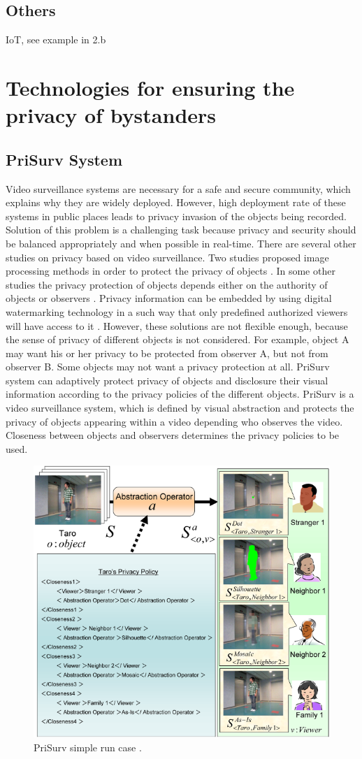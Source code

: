 \documentclass[conference]{IEEEtran}
\begin{document}
\subsection{Others}
IoT, see example in 2.b

\section{Technologies for ensuring the privacy of bystanders}\label{Technologies}

\subsection{PriSurv System}
Video surveillance systems are necessary for a safe and secure community, which explains why they are widely deployed. However, high deployment rate of these systems in public places leads to privacy invasion of the objects being recorded. Solution of this problem is a challenging task because privacy and security should be balanced appropriately and when possible in real-time.
There are several other studies on privacy based on video surveillance. Two studies proposed image processing methods in order to protect the privacy of objects \cite{cavallaro2005}\cite{kitahara2004}. In some other studies the privacy protection of objects depends either on the authority of objects or observers \cite{jehan2005}\cite{senior2005}. Privacy information can be embedded by using digital watermarking technology in a such way that only predefined authorized viewers will have access to it \cite{zhang2005}. However, these solutions are not flexible enough, because the sense of privacy of different objects is not considered. For example, object A may want his or her privacy to be protected from observer A, but not from observer B. Some objects may not want a privacy protection at all. 
PriSurv system \cite{chinomi2008PriSurv} can adaptively protect privacy of objects and disclosure their visual information according to the privacy policies of the different objects. PriSurv is a video surveillance system, which is defined by visual abstraction and protects the privacy of objects appearing within a video depending who observes the video. Closeness between objects and observers determines the privacy policies to be used. 

\begin{figure}[t]
\centerline{\includegraphics[width=.5\textwidth]{img//prisurv_simple_demo.png}}
\caption{PriSurv simple run case \cite{chinomi2008PriSurv}.}
\label{fig:prisurv}
\end{figure}
\end{document}
